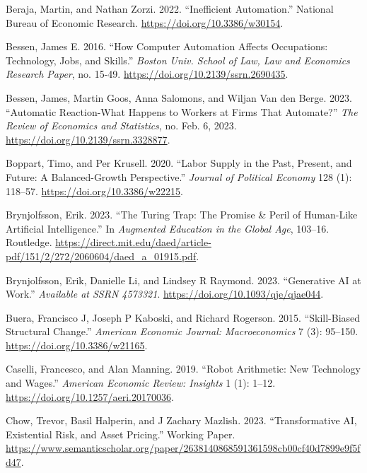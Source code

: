 \documentclass[
  11pt,
  letterpaper,
  DIV=11,
  numbers=noendperiod,
  oneside]{scrartcl}
\newlength{\cslhangindent}
\newenvironment{CSLReferences}[2] %
 {\begin{list}{}{%
  \setlength{\itemindent}{0pt}
  \setlength{\leftmargin}{0pt}
  \setlength{\parsep}{0pt}
  \ifodd #1
   \setlength{\leftmargin}{\cslhangindent}
   \setlength{\itemindent}{-1\cslhangindent}
  \fi
  \setlength{\itemsep}{#2\baselineskip}}}
 {\end{list}}
\begin{document}
\begin{CSLReferences}{1}{0}
Beraja, Martin, and Nathan Zorzi. 2022. {``Inefficient Automation.''}
National Bureau of Economic Research.
\url{https://doi.org/10.3386/w30154}.

Bessen, James E. 2016. {``How Computer Automation Affects Occupations:
Technology, Jobs, and Skills.''} \emph{Boston Univ. School of Law, Law
and Economics Research Paper}, no. 15-49.
\url{https://doi.org/10.2139/ssrn.2690435}.

Bessen, James, Martin Goos, Anna Salomons, and Wiljan Van den Berge.
2023. {``Automatic Reaction-What Happens to Workers at Firms That
Automate?''} \emph{The Review of Economics and Statistics}, no. Feb. 6,
2023. \url{https://doi.org/10.2139/ssrn.3328877}.

Boppart, Timo, and Per Krusell. 2020. {``Labor Supply in the Past,
Present, and Future: A Balanced-Growth Perspective.''} \emph{Journal of
Political Economy} 128 (1): 118--57.
\url{https://doi.org/10.3386/w22215}.

Brynjolfsson, Erik. 2023. {``The Turing Trap: The Promise \& Peril of
Human-Like Artificial Intelligence.''} In \emph{Augmented Education in
the Global Age}, 103--16. Routledge.
\url{https://direct.mit.edu/daed/article-pdf/151/2/272/2060604/daed_a_01915.pdf}.

Brynjolfsson, Erik, Danielle Li, and Lindsey R Raymond. 2023.
{``Generative AI at Work.''} \emph{Available at SSRN 4573321}.
\url{https://doi.org/10.1093/qje/qjae044}.

Buera, Francisco J, Joseph P Kaboski, and Richard Rogerson. 2015.
{``Skill-Biased Structural Change.''} \emph{American Economic Journal:
Macroeconomics} 7 (3): 95--150. \url{https://doi.org/10.3386/w21165}.

Caselli, Francesco, and Alan Manning. 2019. {``Robot Arithmetic: New
Technology and Wages.''} \emph{American Economic Review: Insights} 1
(1): 1--12. \url{https://doi.org/10.1257/aeri.20170036}.

Chow, Trevor, Basil Halperin, and J Zachary Mazlish. 2023.
{``Transformative AI, Existential Risk, and Asset Pricing.''} Working
Paper.
\url{https://www.semanticscholar.org/paper/2638140868591361598cb00cf40d7899e9f5fd47}.


\end{CSLReferences}
\end{document}

